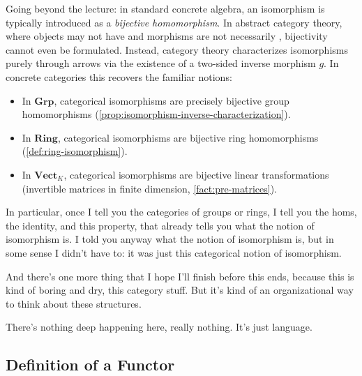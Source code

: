 \begin{content}
\begin{steps}
Going beyond the lecture: in standard concrete algebra, an isomorphism is typically introduced as a \emph{bijective homomorphism}. In abstract category theory, where objects may not have  and morphisms are not necessarily , bijectivity cannot even be formulated. Instead, category theory characterizes isomorphisms purely through arrows via the existence of a two-sided inverse morphism $g$. In concrete categories this recovers the familiar notions:
\begin{itemize}
    \item In $\mathbf{Grp}$, categorical isomorphisms are precisely bijective group homomorphisms (\cref{prop:isomorphism-inverse-characterization}).
    \item In $\mathbf{Ring}$, categorical isomorphisms are bijective ring homomorphisms (\cref{def:ring-isomorphism}).
    \item In $\mathbf{Vect}_K$, categorical isomorphisms are bijective linear transformations (invertible matrices in finite dimension, \cref{fact:pre-matrices}).
\end{itemize}
\end{steps}
\end{content}


\begin{speech}[01:21:46 - 01:22:27]
In particular, once I tell you the categories of groups or rings, I tell you the homs, the identity, and this property, that already tells you what the notion of isomorphism is. I told you anyway what the notion of isomorphism is, but in some sense I didn't have to: it was just this categorical notion of isomorphism.

And there's one more thing that I hope I'll finish before this ends, because this is kind of boring and dry, this category stuff. But it's kind of an organizational way to think about these structures.

There's nothing deep happening here, really nothing. It's just language.
\end{speech}

\subsection{Definition of a Functor}

